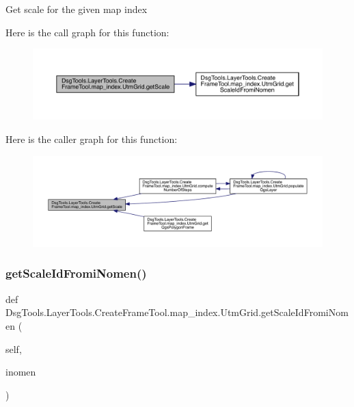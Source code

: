 \begin{DoxyVerb}Get scale for the given map index
\end{DoxyVerb}
 Here is the call graph for this function\+:
\nopagebreak
\begin{figure}[H]
\begin{center}
\leavevmode
\includegraphics[width=350pt]{class_dsg_tools_1_1_layer_tools_1_1_create_frame_tool_1_1map__index_1_1_utm_grid_a5526730674c00c9312d8c4278ed06c75_cgraph}
\end{center}
\end{figure}
Here is the caller graph for this function\+:
\nopagebreak
\begin{figure}[H]
\begin{center}
\leavevmode
\includegraphics[width=350pt]{class_dsg_tools_1_1_layer_tools_1_1_create_frame_tool_1_1map__index_1_1_utm_grid_a5526730674c00c9312d8c4278ed06c75_icgraph}
\end{center}
\end{figure}
\mbox{\label{class_dsg_tools_1_1_layer_tools_1_1_create_frame_tool_1_1map__index_1_1_utm_grid_ac2da63f852d93d4540cb483662ce48e6}} 
\subsubsection{\texorpdfstring{get\+Scale\+Id\+Fromi\+Nomen()}{getScaleIdFromiNomen()}}
{\footnotesize\ttfamily def Dsg\+Tools.\+Layer\+Tools.\+Create\+Frame\+Tool.\+map\+\_\+index.\+Utm\+Grid.\+get\+Scale\+Id\+Fromi\+Nomen (\begin{DoxyParamCaption}\item[{}]{self,  }\item[{}]{inomen }\end{DoxyParamCaption})}

